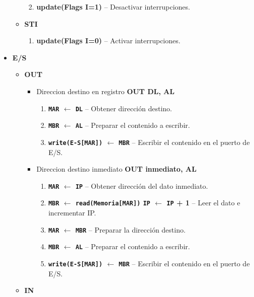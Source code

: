 \documentclass[12pt,oneside]{templates/unerthesis}
\providecommand{\tightlist}{%
  \setlength{\itemsep}{0pt}\setlength{\parskip}{0pt}}
\begin{document}
\begin{itemize}
\begin{itemize}
    \begin{enumerate}
    \def\labelenumi{\arabic{enumi}.}
    \setcounter{enumi}{3}
    \tightlist
    \item
      \textbf{update(Flags I=1)} -- Desactivar interrupciones.
    \end{enumerate}
  \item
    \textbf{STI}

    \begin{enumerate}
    \def\labelenumi{\arabic{enumi}.}
    \setcounter{enumi}{3}
    \tightlist
    \item
      \textbf{update(Flags I=0)} -- Activar interrupciones.
    \end{enumerate}
  \end{itemize}
\item
  \textbf{E/S}

  \begin{itemize}
  \tightlist
  \item
    \textbf{OUT}

    \begin{itemize}
    \tightlist
    \item
      Direccion destino en registro \textbf{OUT DL, AL}

      \begin{enumerate}
      \def\labelenumi{\arabic{enumi}.}
      \setcounter{enumi}{3}
      \tightlist
      \item
        \textbf{\texttt{MAR} \(\leftarrow\) \texttt{DL}} -- Obtener dirección destino.
      \item
        \textbf{\texttt{MBR} \(\leftarrow\) \texttt{AL}} -- Preparar el contenido a escribir.
      \item
        \textbf{\texttt{write(E-S{[}MAR{]})} \(\leftarrow\) \texttt{MBR}} -- Escribir el contenido en el puerto de E/S.
      \end{enumerate}
    \item
      Direccion destino inmediato \textbf{OUT inmediato, AL}

      \begin{enumerate}
      \def\labelenumi{\arabic{enumi}.}
      \setcounter{enumi}{3}
      \tightlist
      \item
        \textbf{\texttt{MAR} \(\leftarrow\) \texttt{IP}} -- Obtener dirección del dato inmediato.
      \item
        \textbf{\texttt{MBR} \(\leftarrow\) \texttt{read(Memoria{[}MAR{]})} \textbar{} \texttt{IP} \(\leftarrow\) \texttt{IP} + 1} -- Leer el dato e incrementar IP.
      \item
        \textbf{\texttt{MAR} \(\leftarrow\) \texttt{MBR}} -- Preparar la dirección destino.
      \item
        \textbf{\texttt{MBR} \(\leftarrow\) \texttt{AL}} -- Preparar el contenido a escribir.
      \item
        \textbf{\texttt{write(E-S{[}MAR{]})} \(\leftarrow\) \texttt{MBR}} -- Escribir el contenido en el puerto de E/S.
      \end{enumerate}
    \end{itemize}
  \item
    \textbf{IN}


\end{itemize}
\end{itemize}
\end{document}
